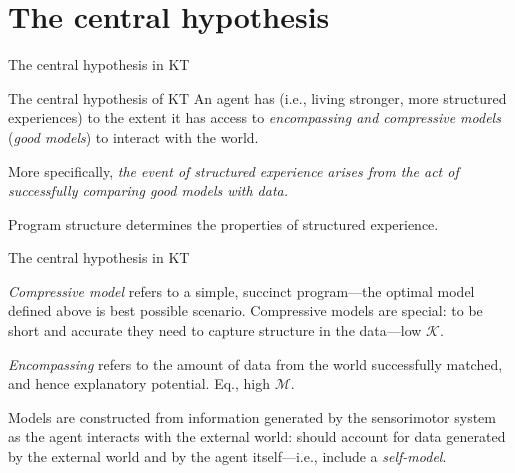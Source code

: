 \section{The central hypothesis}

\begin{frame}[label=ladila]{The central hypothesis in KT}

\begin{exampleblock}{The central hypothesis of KT}
An agent has \SEP (i.e., living stronger, more structured experiences) to the extent it has access to {\em encompassing and compressive models} ({\em good models}) to interact with the world.  

\vspace{0.5cm}

More specifically,  {\em the event  of structured experience  arises from the act of successfully comparing  good models with data. }  \vspace{0.5cm}

Program structure determines the properties of structured experience. 
\end{exampleblock}
 \vfill

 

\end{frame}

\begin{frame}[label=ladila]{The central hypothesis in KT}
 
    {\em Compressive model} refers to a simple, succinct program---the optimal model defined above is best possible scenario. Compressive models are special: to be short and accurate they need to capture structure in the data---low $\mathcal K$.  \vfill
    
        {\em Encompassing} refers to the amount of data from the world  successfully matched, and hence   explanatory potential.  Eq., high $\mathcal M$.   %
        \vfill
    
    Models are constructed from information generated by the sensorimotor system as the agent interacts with the external world: should account for data generated by the external world and by the agent itself---i.e., include a {\em self-model}.
    
 
\end{frame}